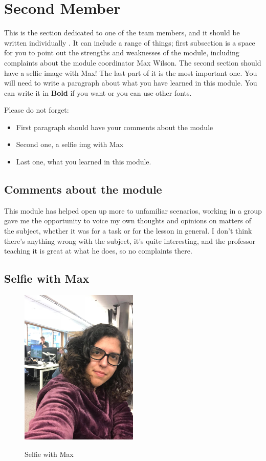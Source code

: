 \section{Second Member}
This is the section dedicated to one of the team members, and it should be written individually . It can include a range of things; first subsection is a space for you to point out the strengths and weaknesses of the module, including complaints about the module coordinator Max Wilson. The second section should have a selfie image with Max! The last part of it is the most important one. You will need to write a paragraph about what you have learned in this module. You can write it in \textbf{Bold} if you want or you can use other fonts. 

Please do not forget:
\begin{itemize}
	\item First paragraph should have your comments about the module
	\item Second one, a selfie img with Max
	\item Last one, what you learned in this module.
\end{itemize}

\subsection{Comments about the module}
This module has helped open up more to unfamiliar scenarios, working in a group gave me the opportunity to voice my own thoughts and opinions on matters of the subject, whether it was for a task or for the lesson in general. I don't think there's anything wrong with the subject, it's quite interesting, and the professor teaching it is great at what he does, so no complaints there.

\subsection{Selfie with Max}

\begin{figure}[h]
\caption{Selfie with Max}
\centering
\includegraphics[width=0.5\textwidth]{SelfieWithMax.jpg}
\label{fig:selfie}
\end{figure}

